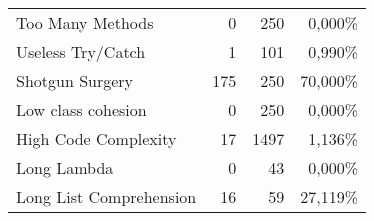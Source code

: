 \begin{table}[]
\begin{tabular}{lrrr}
    \rowcolor[HTML]{FFFFFF} 
    Too Many Methods                                                & 0                                                                & 250                                                                                                                       & 0,000\%                                                              \\
    \rowcolor[HTML]{EFEFEF} 
    Useless Try/Catch                                               & 1                                                                & 101                                                                                                                       & 0,990\%                                                              \\
    \rowcolor[HTML]{FFFFFF} 
    Shotgun Surgery                                                 & 175                                                              & 250                                                                                                                       & 70,000\%                                                             \\
    \rowcolor[HTML]{EFEFEF} 
    Low class cohesion                                              & 0                                                                & 250                                                                                                                       & 0,000\%                                                              \\
    \rowcolor[HTML]{FFFFFF} 
    High Code Complexity                                            & 17                                                               & 1497                                                                                                                      & 1,136\%                                                              \\
    \rowcolor[HTML]{EFEFEF} 
    Long Lambda                                                     & 0                                                                & 43                                                                                                                        & 0,000\%                                                              \\
    \rowcolor[HTML]{FFFFFF} 
    Long List Comprehension                                         & 16                                                               & 59                                                                                                                        & 27,119\%                                                            
    \end{tabular}
    \end{table}